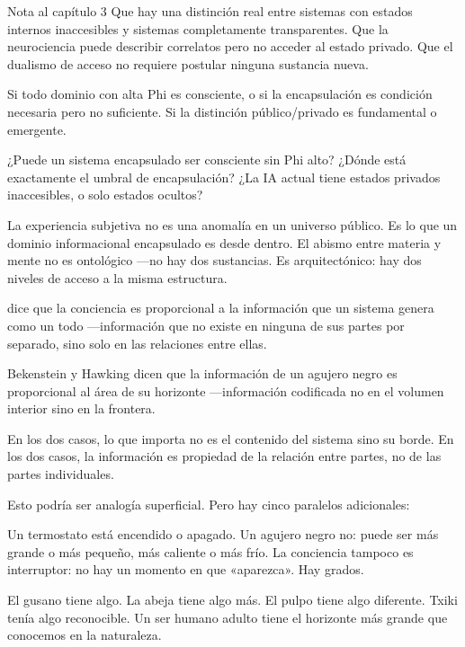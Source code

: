 \begin{notacap}{Nota al capítulo 3}
 Que hay una distinción real entre sistemas con estados internos inaccesibles y sistemas completamente transparentes. Que la neurociencia puede describir correlatos pero no acceder al estado privado. Que el dualismo de acceso no requiere postular ninguna sustancia nueva.

 Si todo dominio con alta Phi es consciente, o si la encapsulación es condición necesaria pero no suficiente. Si la distinción público/privado es fundamental o emergente.

 ¿Puede un sistema encapsulado ser consciente sin Phi alto? ¿Dónde está exactamente el umbral de encapsulación? ¿La IA actual tiene estados privados inaccesibles, o solo estados ocultos?

 La experiencia subjetiva no es una anomalía en un universo público. Es lo que un dominio informacional encapsulado es desde dentro. El abismo entre materia y mente no es ontológico —no hay dos sustancias. Es arquitectónico: hay dos niveles de acceso a la misma estructura.
\end{notacap}
\noindent {} dice que la conciencia es proporcional a la información que un sistema genera como un todo —información que no existe en ninguna de sus partes por separado, sino solo en las relaciones entre ellas.

Bekenstein y Hawking dicen que la información de un agujero negro es proporcional al área de su horizonte —información codificada no en el volumen interior sino en la frontera.

En los dos casos, lo que importa no es el contenido del sistema sino su borde. En los dos casos, la información es propiedad de la relación entre partes, no de las partes individuales.

Esto podría ser analogía superficial. Pero hay cinco paralelos adicionales:

\noindent Un termostato está encendido o apagado. Un agujero negro no: puede ser más grande o más pequeño, más caliente o más frío. La conciencia tampoco es interruptor: no hay un momento en que «aparezca». Hay grados.

El gusano tiene algo. La abeja tiene algo más. El pulpo tiene algo diferente. Txiki tenía algo reconocible. Un ser humano adulto tiene el horizonte más grande que conocemos en la naturaleza.

